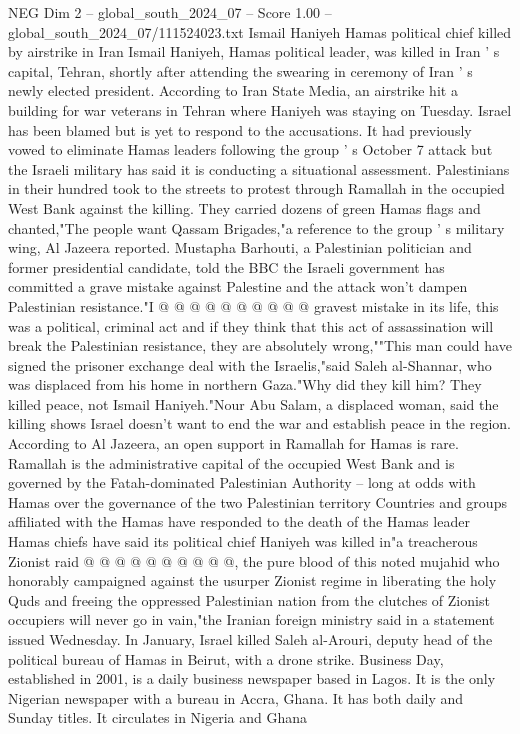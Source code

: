 \begin{textsample}{NEG Dim 2 – global\_south\_2024\_07 – Score 1.00 – global\_south\_2024\_07/111524023.txt}  \label{ex:f2_neg_280}
Ismail Haniyeh Hamas political chief killed by airstrike in Iran Ismail Haniyeh, Hamas political leader, was killed in Iran ' s capital, Tehran, shortly after attending the swearing in ceremony of Iran ' s newly elected president.
According to Iran State Media, an airstrike hit a building for war veterans in Tehran where Haniyeh was staying on Tuesday.
Israel has been blamed but is yet to respond to the accusations.
It had previously vowed to eliminate Hamas leaders following the group ' s October 7 attack but the Israeli military has said it is conducting a situational assessment.
Palestinians in their hundred took to the streets to protest through Ramallah in the occupied West Bank against the killing.
They carried dozens of green Hamas flags and chanted,"The people want Qassam Brigades,"a reference to the group ' s military wing, Al Jazeera reported.
Mustapha Barhouti, a Palestinian politician and former presidential candidate, told the BBC the Israeli government has committed a grave mistake against Palestine and the attack won't dampen Palestinian resistance."I @ @ @ @ @ @ @ @ @ @ gravest mistake in its life, this was a political, criminal act and if they think that this act of assassination will break the Palestinian resistance, they are absolutely wrong,""This man could have signed the prisoner exchange deal with the Israelis,"said Saleh al-Shannar, who was displaced from his home in northern Gaza."Why did they kill him?
They killed peace, not Ismail Haniyeh."Nour Abu Salam, a displaced woman, said the killing shows Israel doesn't want to end the war and establish peace in the region.
According to Al Jazeera, an open support in Ramallah for Hamas is rare.
Ramallah is the administrative capital of the occupied West Bank and is governed by the Fatah-dominated Palestinian Authority -- long at odds with Hamas over the governance of the two Palestinian territory Countries and groups affiliated with the Hamas have responded to the death of the Hamas leader Hamas chiefs have said its political chief Haniyeh was killed in"a treacherous Zionist raid @ @ @ @ @ @ @ @ @ @, the pure blood of this noted mujahid who honorably campaigned against the usurper Zionist regime in liberating the holy Quds and freeing the oppressed Palestinian nation from the clutches of Zionist occupiers will never go in vain,"the Iranian foreign ministry said in a statement issued Wednesday.
In January, Israel killed Saleh al-Arouri, deputy head of the political bureau of Hamas in Beirut, with a drone strike.
Business Day, established in 2001, is a daily business newspaper based in Lagos.
It is the only Nigerian newspaper with a bureau in Accra, Ghana.
It has both daily and Sunday titles.
It circulates in Nigeria and Ghana

\end{textsample}

